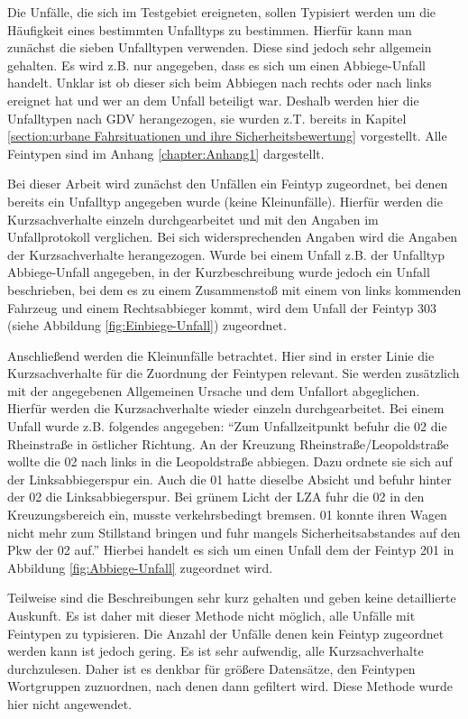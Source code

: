Die Unfälle, die sich im Testgebiet ereigneten, sollen Typisiert werden um die Häufigkeit eines bestimmten Unfalltyps zu bestimmen. Hierfür kann man zunächst die sieben Unfalltypen verwenden. Diese sind jedoch sehr allgemein gehalten. Es wird z.B. nur angegeben, dass es sich um einen Abbiege-Unfall handelt. Unklar ist ob dieser sich beim Abbiegen nach rechts oder nach links ereignet hat und wer an dem Unfall beteiligt war. Deshalb werden hier die Unfalltypen nach GDV herangezogen, sie wurden z.T. bereits in Kapitel \ref{section:urbane Fahrsituationen und ihre Sicherheitsbewertung} vorgestellt. Alle Feintypen sind im  Anhang \ref{chapter:Anhang1} dargestellt.

Bei dieser Arbeit wird zunächst den Unfällen ein Feintyp zugeordnet, bei denen bereits ein Unfalltyp angegeben wurde (keine Kleinunfälle). Hierfür werden die Kurzsachverhalte einzeln durchgearbeitet und mit den Angaben im Unfallprotokoll verglichen. Bei sich widersprechenden Angaben wird die Angaben der Kurzsachverhalte herangezogen. Wurde bei einem Unfall z.B. der Unfalltyp Abbiege-Unfall angegeben, in der Kurzbeschreibung wurde jedoch ein Unfall beschrieben, bei dem es zu einem Zusammenstoß mit einem von links kommenden Fahrzeug und einem Rechtsabbieger kommt, wird dem Unfall der Feintyp 303 (siehe Abbildung \ref{fig:Einbiege-Unfall}) zugeordnet.

Anschließend werden die Kleinunfälle betrachtet. Hier sind in erster Linie die Kurzsachverhalte für die Zuordnung der Feintypen relevant. Sie werden zusätzlich mit der angegebenen Allgemeinen Ursache und dem Unfallort abgeglichen. Hierfür werden die Kurzsachverhalte wieder einzeln durchgearbeitet. Bei einem Unfall wurde z.B. folgendes angegeben: \enquote{Zum Unfallzeitpunkt befuhr die 02 die Rheinstraße in östlicher Richtung. An der Kreuzung Rheinstraße/Leopoldstraße wollte die 02 nach links in die Leopoldstraße abbiegen. Dazu ordnete sie sich auf der Linksabbiegerspur ein. Auch die 01 hatte dieselbe Absicht und befuhr hinter der 02 die Linksabbiegerspur. Bei grünem Licht der LZA fuhr die 02 in den Kreuzungsbereich ein, musste verkehrsbedingt bremsen. 01 konnte ihren Wagen nicht mehr zum Stillstand bringen und fuhr mangels Sicherheitsabstandes auf den Pkw der 02 auf.} Hierbei handelt es sich um einen Unfall dem der Feintyp 201 in Abbildung \ref{fig:Abbiege-Unfall} zugeordnet wird.

Teilweise sind die Beschreibungen sehr kurz gehalten und geben keine detaillierte Auskunft. Es ist daher mit dieser Methode nicht möglich, alle Unfälle mit Feintypen zu typisieren. Die Anzahl der Unfälle denen kein Feintyp zugeordnet werden kann ist jedoch gering. Es ist sehr aufwendig, alle Kurzsachverhalte durchzulesen. Daher ist es denkbar für größere Datensätze, den Feintypen Wortgruppen zuzuordnen, nach denen dann gefiltert wird. Diese Methode wurde hier nicht angewendet. %

